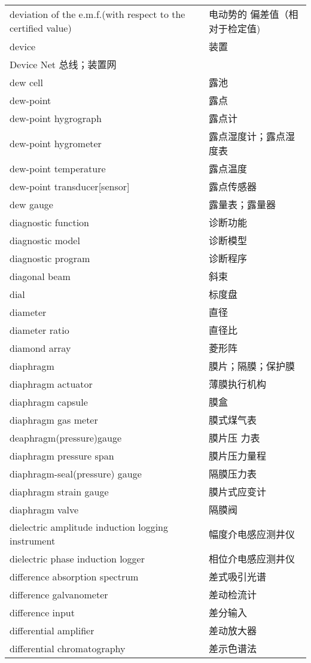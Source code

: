 \documentclass[
]{article}
\begin{document}
\begin{longtable}[]{@{}ll@{}}
deviation of the e.m.f.(with respect to the certified value) & 电动势的
偏差值（相对于检定值) \\
device & 装置 \\
Device Net 总线；装置网 & \\
dew cell & 露池 \\
dew-point & 露点 \\
dew-point hygrograph & 露点计 \\
dew-point hygrometer & 露点湿度计；露点湿度表 \\
dew-point temperature & 露点温度 \\
dew-point transducer{[}sensor{]} & 露点传感器 \\
dew gauge & 露量表；露量器 \\
diagnostic function & 诊断功能 \\
diagnostic model & 诊断模型 \\
diagnostic program & 诊断程序 \\
diagonal beam & 斜束 \\
dial & 标度盘 \\
diameter & 直径 \\
diameter ratio & 直径比 \\
diamond array & 菱形阵 \\
diaphragm & 膜片；隔膜；保护膜 \\
diaphragm actuator & 薄膜执行机构 \\
diaphragm capsule & 膜盒 \\
diaphragm gas meter & 膜式煤气表 \\
deaphragm(pressure)gauge & 膜片压 力表 \\
diaphragm pressure span & 膜片压力量程 \\
diaphragm-seal(pressure) gauge & 隔膜压力表 \\
diaphragm strain gauge & 膜片式应变计 \\
diaphragm valve & 隔膜阀 \\
dielectric amplitude induction logging instrument &
幅度介电感应测井仪 \\
dielectric phase induction logger & 相位介电感应测井仪 \\
difference absorption spectrum & 差式吸引光谱 \\
difference galvanometer & 差动检流计 \\
difference input & 差分输入 \\
differential amplifier & 差动放大器 \\
differential chromatography & 差示色谱法 \\

\end{longtable}
\end{document}
